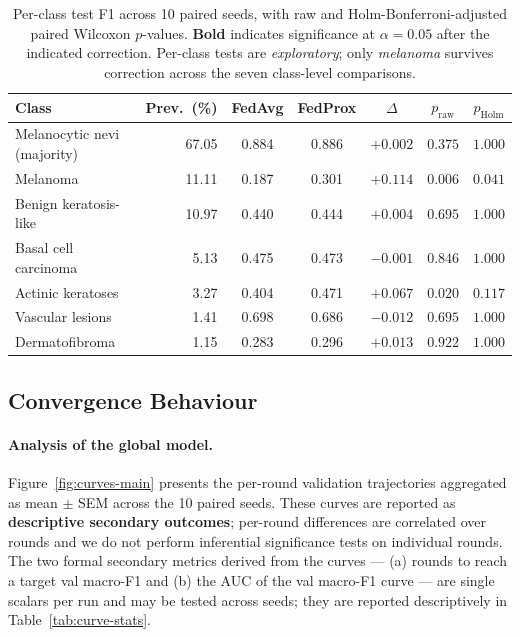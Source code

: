 \documentclass[11pt,a4paper]{article}
\begin{document}
\begin{table}[!htbp]
\centering
\small
\begin{tabular}{lrccccc}
\toprule
Class                              & Prev.\ (\%) & FedAvg & FedProx & $\Delta$ & $p_{\text{raw}}$ & $p_{\text{Holm}}$ \\
\midrule
Melanocytic nevi (majority)        & 67.05 & 0.884 & 0.886 & $+0.002$           & $0.375$           & $1.000$ \\
Melanoma                           & 11.11 & 0.187 & 0.301 & $\mathbf{+0.114}$  & $\mathbf{0.006}$  & $\mathbf{0.041}$ \\
Benign keratosis-like              & 10.97 & 0.440 & 0.444 & $+0.004$           & $0.695$           & $1.000$ \\
Basal cell carcinoma               &  5.13 & 0.475 & 0.473 & $-0.001$           & $0.846$           & $1.000$ \\
Actinic keratoses                  &  3.27 & 0.404 & 0.471 & $+0.067$           & $0.020$           & $0.117$ \\
Vascular lesions                   &  1.41 & 0.698 & 0.686 & $-0.012$           & $0.695$           & $1.000$ \\
Dermatofibroma                     &  1.15 & 0.283 & 0.296 & $+0.013$           & $0.922$           & $1.000$ \\
\bottomrule
\end{tabular}
\caption{Per-class test F1 across 10 paired seeds, with raw and
Holm-Bonferroni-adjusted paired Wilcoxon $p$-values. \textbf{Bold} indicates
significance at $\alpha = 0.05$ after the indicated correction. Per-class
tests are \emph{exploratory}; only \textit{melanoma} survives correction
across the seven class-level comparisons.}
\label{tab:per-class}
\end{table}

\subsection{Convergence Behaviour}\label{sec:convergence}

\paragraph{Analysis of the global model.}
Figure~\ref{fig:curves-main} presents the per-round validation
trajectories aggregated as mean $\pm$ SEM across the 10 paired seeds.
These curves are reported as \textbf{descriptive secondary outcomes};
per-round differences are correlated over rounds and we do not perform
inferential significance tests on individual rounds. The two formal
secondary metrics derived from the curves --- (a) rounds to reach a
target val macro-F1 and (b) the AUC of the val macro-F1 curve --- are
single scalars per run and may be tested across seeds; they are reported
descriptively in Table~\ref{tab:curve-stats}.
\end{document}
